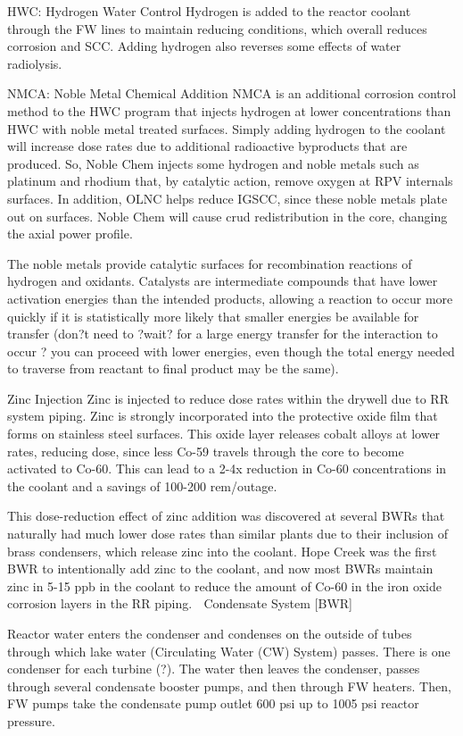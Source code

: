 \documentclass[10pt]{article}
\begin{document}
HWC: Hydrogen Water Control
Hydrogen is added to the reactor coolant through the FW lines to maintain reducing conditions, which overall reduces corrosion and SCC. Adding hydrogen also reverses some effects of water radiolysis. 

NMCA: Noble Metal Chemical Addition
NMCA is an additional corrosion control method to the HWC program that injects hydrogen at lower concentrations than HWC with noble metal treated surfaces. Simply adding hydrogen to the coolant will increase dose rates due to additional radioactive byproducts that are produced. So, Noble Chem injects some hydrogen and noble metals such as platinum and rhodium that, by catalytic action, remove oxygen at RPV internals surfaces. In addition, OLNC helps reduce IGSCC, since these noble metals plate out on surfaces. Noble Chem will cause crud redistribution in the core, changing the axial power profile.

The noble metals provide catalytic surfaces for recombination reactions of hydrogen and oxidants. Catalysts are intermediate compounds that have lower activation energies than the intended products, allowing a reaction to occur more quickly if it is statistically more likely that smaller energies be available for transfer (don?t need to ?wait? for a large energy transfer for the interaction to occur ? you can proceed with lower energies, even though the total energy needed to traverse from reactant to final product may be the same). 

Zinc Injection
Zinc is injected to reduce dose rates within the drywell due to RR system piping. Zinc is strongly incorporated into the protective oxide film that forms on stainless steel surfaces. This oxide layer releases cobalt alloys at lower rates, reducing dose, since less Co-59 travels through the core to become activated to Co-60. This can lead to a 2-4x reduction in Co-60 concentrations in the coolant and a savings of 100-200 rem/outage.

This dose-reduction effect of zinc addition was discovered at several BWRs that naturally had much lower dose rates than similar plants due to their inclusion of brass condensers, which release zinc into the coolant. Hope Creek was the first BWR to intentionally add zinc to the coolant, and now most BWRs maintain zinc in 5-15 ppb in the coolant to reduce the amount of Co-60 in the iron oxide corrosion layers in the RR piping.  

Condensate System [BWR]

Reactor water enters the condenser and condenses on the outside of tubes through which lake water (Circulating Water (CW) System) passes. There is one condenser for each turbine (?). The water then leaves the condenser, passes through several condensate booster pumps, and then through FW heaters. Then, FW pumps take the condensate pump outlet 600 psi up to 1005 psi reactor pressure. 
\end{document}
